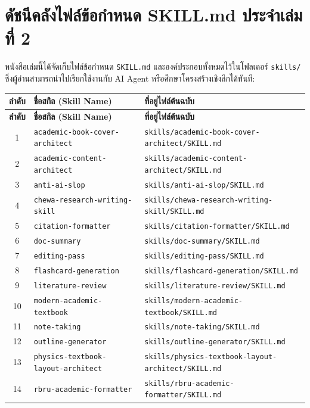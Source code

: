 \section{ดัชนีคลังไฟล์ข้อกำหนด SKILL.md ประจำเล่มที่ 2}

หนังสือเล่มนี้ได้จัดเก็บไฟล์ข้อกำหนด \texttt{SKILL.md} และองค์ประกอบทั้งหมดไว้ในโฟลเดอร์ \texttt{skills/} ซึ่งผู้อ่านสามารถนำไปเรียกใช้งานกับ AI Agent หรือศึกษาโครงสร้างเชิงลึกได้ทันที:

\small
\begin{longtable}{|c|p{}|p{}|}
\hline
\textbf{ลำดับ} & \textbf{ชื่อสกิล (Skill Name)} & \textbf{ที่อยู่ไฟล์ต้นฉบับ} \\ \hline
\endfirsthead
\hline
\textbf{ลำดับ} & \textbf{ชื่อสกิล (Skill Name)} & \textbf{ที่อยู่ไฟล์ต้นฉบับ} \\ \hline
\endhead
1 & \texttt{academic-book-cover-architect} & \texttt{skills/academic-book-cover-architect/SKILL.md} \\ \hline
2 & \texttt{academic-content-architect} & \texttt{skills/academic-content-architect/SKILL.md} \\ \hline
3 & \texttt{anti-ai-slop} & \texttt{skills/anti-ai-slop/SKILL.md} \\ \hline
4 & \texttt{chewa-research-writing-skill} & \texttt{skills/chewa-research-writing-skill/SKILL.md} \\ \hline
5 & \texttt{citation-formatter} & \texttt{skills/citation-formatter/SKILL.md} \\ \hline
6 & \texttt{doc-summary} & \texttt{skills/doc-summary/SKILL.md} \\ \hline
7 & \texttt{editing-pass} & \texttt{skills/editing-pass/SKILL.md} \\ \hline
8 & \texttt{flashcard-generation} & \texttt{skills/flashcard-generation/SKILL.md} \\ \hline
9 & \texttt{literature-review} & \texttt{skills/literature-review/SKILL.md} \\ \hline
10 & \texttt{modern-academic-textbook} & \texttt{skills/modern-academic-textbook/SKILL.md} \\ \hline
11 & \texttt{note-taking} & \texttt{skills/note-taking/SKILL.md} \\ \hline
12 & \texttt{outline-generator} & \texttt{skills/outline-generator/SKILL.md} \\ \hline
13 & \texttt{physics-textbook-layout-architect} & \texttt{skills/physics-textbook-layout-architect/SKILL.md} \\ \hline
14 & \texttt{rbru-academic-formatter} & \texttt{skills/rbru-academic-formatter/SKILL.md} \\ \hline

\end{longtable}
